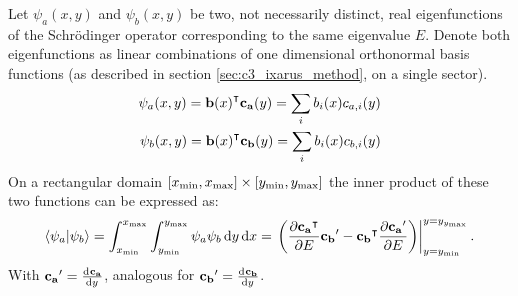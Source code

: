 \begin{theorem}
  Let $\psi_a(x, y)$ and $\psi_b(x, y)$ be two, not necessarily distinct, real eigenfunctions of the Schrödinger operator corresponding to the same eigenvalue $E$. Denote both eigenfunctions as linear combinations of one dimensional orthonormal basis functions (as described in section \ref{sec:c3_ixarus_method}, on a single sector).
  \begin{align*}
    \psi_a(x, y) = {\vb{b}(x)}^\intercal \vb{c_a}(y) = \sum_i b_i(x) c_{a, i}(y) \\
    \psi_b(x, y) = {\vb{b}(x)}^\intercal \vb{c_b}(y) = \sum_i b_i(x) c_{b, i}(y)
  \end{align*}
  On a rectangular domain $[{x_{\text{min}}}, {x_{\text{max}}}] \times [{y_{\text{min}}}, {y_{\text{max}}}]$ the inner product of these two functions can be expressed as:
  $$
    \bra{\psi_a}\ket{\psi_b} = \int_{x_{\text{min}}}^{x_{\text{max}}} \int_{y_{\text{min}}}^{y_{\text{max}}} \psi_a\psi_b \, \dd y \, \dd x = \left. \left(\pdv{{\vb{c_a}}^\intercal}{E} \vb{c_b}' - {\vb{c_b}}^\intercal\pdv{\vb{c_a}'}{E} \right) \right|_{y={y_{\text{min}}}}^{y=y_{y_{\text{max}}}} \text{.}
  $$
  With $\vb{c_a}' = \dv[]{\vb{c_a}}{y}$, analogous for $\vb{c_b}' = \dv[]{\vb{c_b}}{y}$.
\end{theorem}
